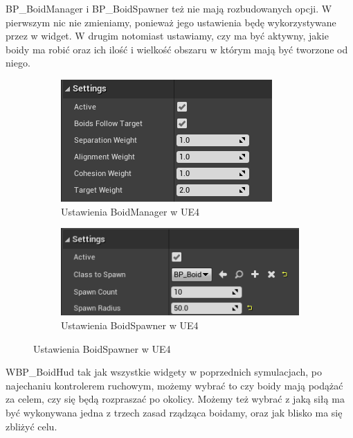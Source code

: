 \documentclass[a4paper,12pt,reqno]{article}
\begin{document}
BP\_BoidManager i BP\_BoidSpawner też nie mają rozbudowanych opcji. W pierwszym nic nie zmieniamy, ponieważ jego ustawienia będę wykorzystywane przez w widget. W drugim notomiast ustawiamy, czy ma być aktywny, jakie boidy ma robić oraz ich ilość i wielkość obszaru w którym mają być tworzone od niego.

\begin{figure}[H]%
	\centering
	\begin{subfigure}{.5\textwidth}
		\centering
		\includegraphics[width=0.8\linewidth]{graphics//boids/BP_BoidManager.png}
		\caption{Ustawienia BoidManager w UE4 }	
		\label{ref:subref_a}
	\end{subfigure}%
	\begin{subfigure}{.5\textwidth}
		\centering
		\includegraphics[width=0.8\linewidth]{graphics//boids/BP_BoidSpawner.png}
		\caption{Ustawienia BoidSpawner w UE4 }
		\label{ref:subref_b}
	\end{subfigure}%
\label{ref:ref}
\end{figure}

WBP\_BoidHud tak jak wszystkie widgety w poprzednich symulacjach, po najechaniu kontrolerem ruchowym, możemy wybrać to czy boidy mają podążać za celem, czy się będą rozpraszać po okolicy. Możemy też wybrać z jaką siłą ma być wykonywana jedna z trzech zasad rządząca boidamy, oraz jak blisko ma się zbliżyć celu. 
\end{document}
